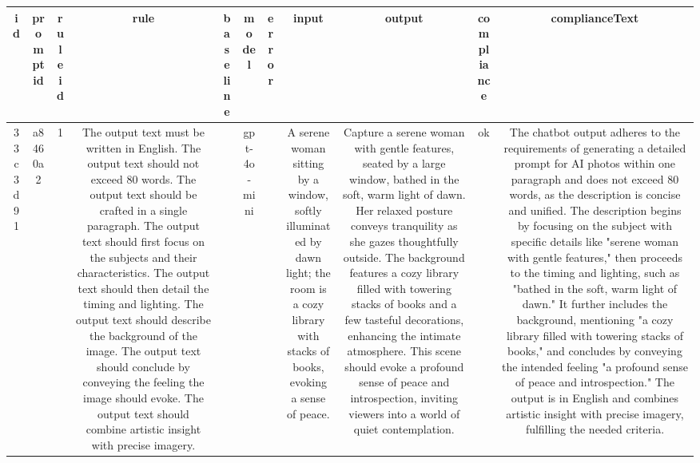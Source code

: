 
  \begin{table}[h!]
  \centering
  \begin{tabular}{|c|c|c|c|c|c|c|c|c|c|c|}
  \hline
  id & promptid & ruleid & rule & baseline & model & error & input & output & compliance & complianceText \\
  \hline
  33c3d91 & a8460a2 & 1 & The output text must be written in English. The output text should not exceed 80 words. The output text should be crafted in a single paragraph. The output text should first focus on the subjects and their characteristics. The output text should then detail the timing and lighting. The output text should describe the background of the image. The output text should conclude by conveying the feeling the image should evoke. The output text should combine artistic insight with precise imagery. &  & gpt-4o-mini &  & A serene woman sitting by a window, softly illuminated by dawn light; the room is a cozy library with stacks of books, evoking a sense of peace. & Capture a serene woman with gentle features, seated by a large window, bathed in the soft, warm light of dawn. Her relaxed posture conveys tranquility as she gazes thoughtfully outside. The background features a cozy library filled with towering stacks of books and a few tasteful decorations, enhancing the intimate atmosphere. This scene should evoke a profound sense of peace and introspection, inviting viewers into a world of quiet contemplation. & ok & The chatbot output adheres to the requirements of generating a detailed prompt for AI photos within one paragraph and does not exceed 80 words, as the description is concise and unified. The description begins by focusing on the subject with specific details like "serene woman with gentle features," then proceeds to the timing and lighting, such as "bathed in the soft, warm light of dawn." It further includes the background, mentioning "a cozy library filled with towering stacks of books," and concludes by conveying the intended feeling "a profound sense of peace and introspection." The output is in English and combines artistic insight with precise imagery, fulfilling the needed criteria.


\end{tabular}
\end{table}
